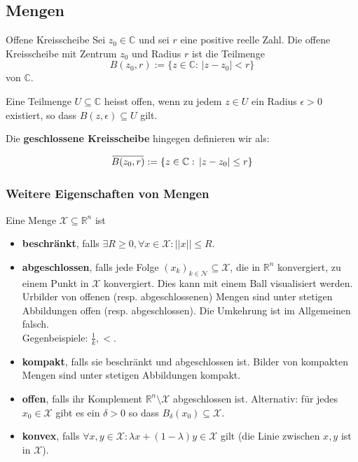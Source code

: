 \documentclass[a4paper,10pt]{article}
\def\X{\mathcal{X}}
\def\N{\mathcal{N}}
\def\R{\mathbb{R}}
\def\C{\mathbb{C}}
\newcommand{\overbar}[1]{\mkern 1.5mu\overline{\mkern-1.5mu#1\mkern-1.5mu}\mkern 1.5mu}
\begin{document}
\subsection{Mengen}

\begin{subbox}{Offene Kreisscheibe}
  Sei $z_0\in\mathbb{C}$ und sei $r$ eine positive reelle Zahl. Die offene Kreisscheibe mit Zentrum $z_0$ und Radius $r$ ist die Teilmenge
  $$
  B(z_0, r) := \{ z \in \mathbb{C} : \, |z-z_0| < r \}
  $$
  von $\mathbb{C}$.
\end{subbox}

Eine Teilmenge $U \subseteq \C$ heisst offen, wenn zu jedem $z \in U$ ein Radius $\epsilon>0$ existiert, so dass $B(z,\epsilon) \subseteq U$ gilt.

Die \textbf{geschlossene Kreisscheibe} hingegen definieren wir als:

$$
\overbar{B(z_0, r)} := \{ z \in \mathbb{C} : \, |z-z_0| \leq r \}
$$

\subsubsection{Weitere Eigenschaften von Mengen}

Eine Menge \(\X \subseteq \R^n \) ist
\begin{itemize}
  \item \textbf{beschränkt}, falls \(\exists R \ge 0, \forall x \in \X: ||x|| \le R\).
  \item \textbf{abgeschlossen}, falls jede Folge \((x_k)_{k\in \N} \subseteq \X\), die in \(\R^n\) konvergiert, zu einem Punkt in \(\X\) konvergiert. Dies kann mit einem Ball visualisiert werden. \\Urbilder von offenen (resp. abgeschlossenen) Mengen sind unter stetigen Abbildungen offen (resp. abgeschlossen). Die Umkehrung ist im Allgemeinen falsch.\\
  Gegenbeispiele: \(\frac{1}{k}, <\).
  \item \textbf{kompakt}, falls sie beschränkt und abgeschlossen ist. Bilder von kompakten Mengen sind unter stetigen Abbildungen kompakt.
  \item \textbf{offen}, falls ihr Komplement \(\R^n \setminus \X\) abgeschlossen ist. Alternativ: für jedes $x_0 \in \X$ gibt es ein $\delta > 0$ so dass $B_\delta(x_0) \subseteq \X$.
  \item \textbf{konvex}, falls \(\forall x, y \in \X: \lambda x + (1 - \lambda)y \in \X\) gilt (die Linie zwischen \(x, y\) ist in \(\X\)).
\end{itemize}
\end{document}
